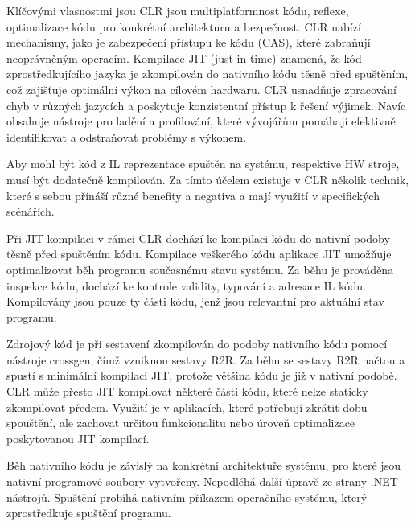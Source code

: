 Klíčovými vlasnostmi jsou CLR jsou multiplatformnost kódu, reflexe, optimalizace kódu pro konkrétní architekturu a bezpečnost. CLR nabízí mechanismy, jako je zabezpečení přístupu ke kódu (CAS), které zabraňují neoprávněným operacím. Kompilace JIT (just-in-time) znamená, že kód zprostředkujícího jazyka je zkompilován do nativního kódu těsně před spuštěním, což zajišťuje optimální výkon na cílovém hardwaru. CLR usnadňuje zpracování chyb v různých jazycích a poskytuje konzistentní přístup k řešení výjimek. Navíc obsahuje nástroje pro ladění a profilování, které vývojářům pomáhají efektivně identifikovat a odstraňovat problémy s výkonem.

Aby mohl být kód z IL reprezentace spuštěn na systému, respektive HW stroje, musí být dodatečně kompilován. Za tímto účelem existuje v CLR několik technik, které s sebou přínáší různé benefity a negativa a mají využití v specifických scénářích.


Při JIT kompilaci v rámci CLR dochází ke kompilaci kódu do nativní podoby těsně před spuštěním kódu. Kompilace veškerého kódu aplikace JIT umožňuje optimalizovat běh programu současnému stavu systému. Za běhu je prováděna inspekce kódu, dochází ke kontrole validity, typování a adresace IL kódu. Kompilovány jsou pouze ty části kódu, jenž jsou relevantní pro aktuální stav programu.


Zdrojový kód je při sestavení zkompilován do podoby nativního kódu pomocí nástroje crossgen, čímž vzniknou sestavy R2R. Za běhu se sestavy R2R načtou a spustí s minimální kompilací JIT, protože většina kódu je již v nativní podobě. CLR může přesto JIT kompilovat některé části kódu, které nelze staticky zkompilovat předem. Využití je v aplikacích, které potřebují zkrátit dobu spouštění, ale zachovat určitou funkcionalitu nebo úroveň optimalizace poskytovanou JIT kompilací.


Běh nativního kódu je závislý na konkrétní architektuře systému, pro které jsou nativní programové soubory vytvořeny. Nepodléhá další úpravě ze strany .NET nástrojů. Spuštění probíhá nativním příkazem operačního systému, který zprostředkuje spuštění programu.


